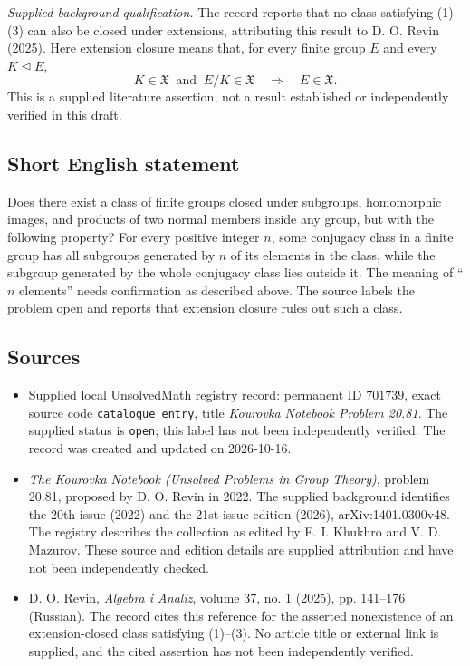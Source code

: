 \documentclass[11pt]{article}
\begin{document}
\textit{Supplied background qualification.} The record reports that no class satisfying (1)--(3) can also be closed under extensions, attributing this result to D. O. Revin (2025). Here extension closure means that, for every finite group \(E\) and every \(K\trianglelefteq E\),
\[
K\in\mathfrak X\ \text{ and }\ E/K\in\mathfrak X
\quad\Longrightarrow\quad E\in\mathfrak X.
\]
This is a supplied literature assertion, not a result established or independently verified in this draft.
\subsection{Short English statement}
Does there exist a class of finite groups closed under subgroups, homomorphic images, and products of two normal members inside any group, but with the following property? For every positive integer \(n\), some conjugacy class in a finite group has all subgroups generated by \(n\) of its elements in the class, while the subgroup generated by the whole conjugacy class lies outside it. The meaning of ``\(n\) elements'' needs confirmation as described above. The source labels the problem open and reports that extension closure rules out such a class.
\subsection{Sources}
\begin{itemize}
\item Supplied local UnsolvedMath registry record: permanent ID \(701739\), exact source code \texttt{catalogue entry}, title \emph{Kourovka Notebook Problem 20.81}. The supplied status is \texttt{open}; this label has not been independently verified. The record was created and updated on 2026-10-16.
\item \emph{The Kourovka Notebook (Unsolved Problems in Group Theory)}, problem 20.81, proposed by D. O. Revin in 2022. The supplied background identifies the 20th issue (2022) and the 21st issue edition (2026), arXiv:1401.0300v48. The registry describes the collection as edited by E. I. Khukhro and V. D. Mazurov. These source and edition details are supplied attribution and have not been independently checked.
\item D. O. Revin, \emph{Algebra i Analiz}, volume 37, no. 1 (2025), pp. 141--176 (Russian). The record cites this reference for the asserted nonexistence of an extension-closed class satisfying (1)--(3). No article title or external link is supplied, and the cited assertion has not been independently verified.
\end{itemize}
\end{document}
